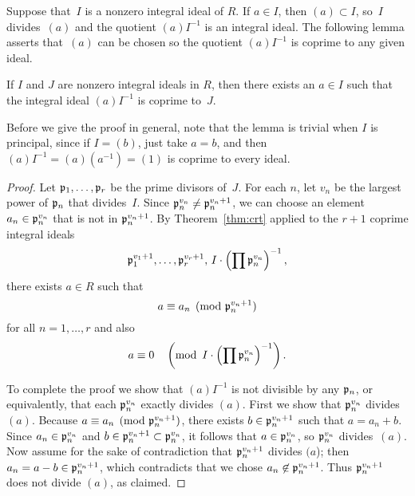 Suppose that~$I$ is a nonzero integral ideal of
$R$.  If $a\in I$, then $(a)\subset I$, so~$I$ divides~$(a)$ and
the quotient $(a)I^{-1}$ is an integral ideal.  The following lemma
asserts that~$(a)$ can be chosen so the quotient $(a)I^{-1}$ is coprime to
any given ideal.
\begin{lemma}\label{lem:magica}
If $I$ and $J$ are nonzero integral ideals in $R$, then there exists
an $a\in I$ such that the integral ideal $(a)I^{-1}$ is coprime to~$J$.
\end{lemma}
Before we give the proof in general, note that the lemma is trivial
when $I$ is principal, since if $I=(b)$, just take $a=b$, and
then $(a)I^{-1} = (a)(a^{-1})= (1)$ is coprime to every ideal.
\begin{proof}
Let $\mathfrak{p}_1, \dots, \mathfrak{p}_r$ be the prime divisors of~$J$.
For each $n$, let $v_n$ be the largest power of $\mathfrak{p}_n$
that divides~$I$.
Since $\mathfrak{p}_n^{v_n}\neq \mathfrak{p}_n^{v_n+1}$,
we can choose an element $a_n\in \mathfrak{p}_n^{v_n}$
that is not in $\mathfrak{p}_n^{v_n+1}$.
By Theorem~\ref{thm:crt} applied to
the $r+1$ coprime integral ideals
$$
  \mathfrak{p}_1^{v_1+1}, \dots, \mathfrak{p}_r^{v_r+1}, \, I\cdot \left(\prod \mathfrak{p}_n^{v_n}\right)^{-1},
$$
there exists $a\in R$
such that
$$
   a \equiv a_n \pmod{\mathfrak{p}_n^{v_n+1}}
$$
for all $n=1, \dots, r$ and
also
$$
   a \equiv 0 \quad \left(\text{mod}\,\,\, I\cdot \left(\prod \mathfrak{p}_n^{v_n}\right)^{-1}\right).
$$

To complete the proof we show that $(a)I^{-1}$ is not
divisible by any $\mathfrak{p}_n$, or equivalently, that each
$\mathfrak{p}_n^{v_n}$ exactly divides $(a)$.
First we show that $\mathfrak{p}_n^{v_n}$ divides $(a)$. Because
$a\equiv a_n \pmod{\mathfrak{p}_n^{v_n+1}}$, there exists
$b \in \mathfrak{p}_n^{v_n+1}$ such that $a = a_n + b$.  Since
$a_n\in \mathfrak{p}_n^{v_n}$ and $b \in \mathfrak{p}_n^{v_n + 1} \subset \mathfrak{p}_n^{v_n}$,
it follows that $a\in \mathfrak{p}_n^{v_n}$,
so $\mathfrak{p}_n^{v_n}$ divides~$(a)$.
Now assume for the sake of contradiction that
$\mathfrak{p}_n^{v_n+1}$ divides $(a$); then $a_n=a-b\in \mathfrak{p}_n^{v_n+1}$, which
contradicts that we chose $a_n \not\in\mathfrak{p}_n^{v_n+1}$.
Thus
$\mathfrak{p}_n^{v_n+1}$ does not divide $(a)$, as claimed.
\end{proof}



